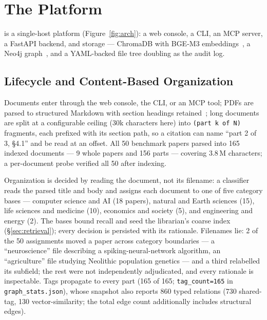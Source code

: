 
\section{The \sys{} Platform}
\label{sec:system}

\sys{} is a single-host platform (Figure~\ref{fig:arch}): a web console, a
CLI, an MCP server, a FastAPI backend, and storage --- ChromaDB
with BGE-M3 embeddings~\cite{chroma,bge-m3}, a Neo4j graph~\cite{neo4j}, and a
YAML-backed file tree doubling as the audit log.

\subsection{Lifecycle and Content-Based Organization}
\label{sec:lifecycle}

Documents enter through the web console, the CLI, or an MCP tool; PDFs are parsed to
structured Markdown with section headings retained~\cite{mineru}; long documents are
split at a configurable ceiling (30k characters here) into \texttt{(part k of N)}
fragments, each prefixed with its section path, so a citation can name ``part 2
of 3, \S4.1'' and be read at an offset. All 50 benchmark
papers parsed into 165 indexed documents --- 9 whole
papers and 156 parts --- covering 3.8\,M characters; a per-document probe
verified all 50 after indexing.

Organization is decided by reading the document, not its filename: a classifier
reads the parsed title and body and assigns each document to one of five category
bases --- computer science and AI (18 papers), natural and Earth sciences (15),
life sciences and medicine (10), economics and society (5), and engineering and
energy (2). The bases bound recall and seed the librarian's coarse index
(\S\ref{sec:retrieval}); every decision is persisted
with its rationale. Filenames lie: 2 of the 50 assignments moved a paper across
category boundaries --- a ``neuroscience'' file describing a spiking-neural-network
algorithm, an ``agriculture'' file studying Neolithic population genetics --- and
a third relabelled its subfield; the rest were not independently
adjudicated, and every rationale is inspectable. Tags propagate to
every part (165 of 165; \texttt{tag\_count=165} in \texttt{graph\_stats.json}), whose
snapshot also reports 860 typed relations (730 shared-tag, 130
vector-similarity; the total edge count additionally includes structural
edges).

